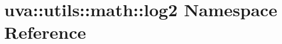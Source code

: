 \hypertarget{namespaceuva_1_1utils_1_1math_1_1log2}{}\section{uva\+:\+:utils\+:\+:math\+:\+:log2 Namespace Reference}
\label{namespaceuva_1_1utils_1_1math_1_1log2}
